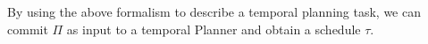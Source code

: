 % 
% 

By using the above formalism to describe a temporal planning task, we can commit
$\Pi$ as input to a temporal Planner and obtain a schedule $\tau$.\\